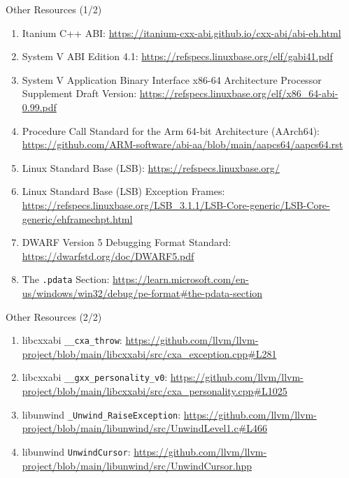 
\begin{frame}{Other Resources (1/2)}
  \begin{enumerate}
    \footnotesize
  \item Itanium C++ ABI: \url{https://itanium-cxx-abi.github.io/cxx-abi/abi-eh.html}
    \medskip

  \item System V ABI Edition 4.1: \url{https://refspecs.linuxbase.org/elf/gabi41.pdf}
  \item System V Application Binary Interface x86-64 Architecture Processor Supplement Draft Version: \url{https://refspecs.linuxbase.org/elf/x86_64-abi-0.99.pdf}
  \item Procedure Call Standard for the Arm 64-bit Architecture (AArch64): \url{https://github.com/ARM-software/abi-aa/blob/main/aapcs64/aapcs64.rst}
    \medskip

  \item Linux Standard Base (LSB): \url{https://refspecs.linuxbase.org/}
  \item Linux Standard Base (LSB) Exception Frames: \url{https://refspecs.linuxbase.org/LSB_3.1.1/LSB-Core-generic/LSB-Core-generic/ehframechpt.html}
  \item DWARF Version 5 Debugging Format Standard: \url{https://dwarfstd.org/doc/DWARF5.pdf}
    \medskip

  \item The \texttt{.pdata} Section: \url{https://learn.microsoft.com/en-us/windows/win32/debug/pe-format\#the-pdata-section}
  \end{enumerate}
\end{frame}

\begin{frame}{Other Resources (2/2)}
  \begin{enumerate}
    \footnotesize
  \item libcxxabi \texttt{\_\_cxa\_throw}: \url{https://github.com/llvm/llvm-project/blob/main/libcxxabi/src/cxa_exception.cpp\#L281}
  \item libcxxabi \texttt{\_\_gxx\_personality\_v0}: \url{https://github.com/llvm/llvm-project/blob/main/libcxxabi/src/cxa_personality.cpp\#L1025}
    \medskip

  \item libunwind \texttt{\_Unwind\_RaiseException}: \url{https://github.com/llvm/llvm-project/blob/main/libunwind/src/UnwindLevel1.c\#L466}
  \item libunwind \texttt{UnwindCursor}: \url{https://github.com/llvm/llvm-project/blob/main/libunwind/src/UnwindCursor.hpp}
  \end{enumerate}
\end{frame}
